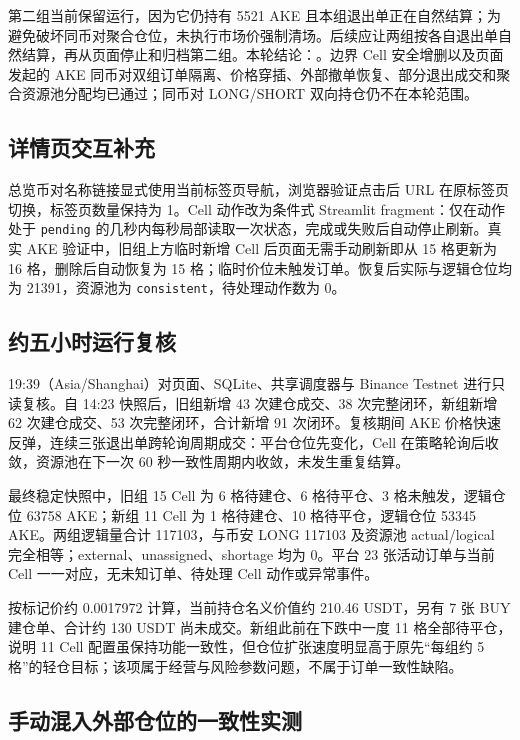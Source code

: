 第二组当前保留运行，因为它仍持有 5521 AKE 且本组退出单正在自然结算；为避免破坏同币对聚合仓位，未执行市场价强制清场。后续应让两组按各自退出单自然结算，再从页面停止和归档第二组。本轮结论：\StatusPass。边界 Cell 安全增删以及页面发起的 AKE 同币对双组订单隔离、价格穿插、外部撤单恢复、部分退出成交和聚合资源池分配均已通过；同币对 LONG/SHORT 双向持仓仍不在本轮范围。

\subsection{详情页交互补充}

总览币对名称链接显式使用当前标签页导航，浏览器验证点击后 URL 在原标签页切换，标签页数量保持为 1。Cell 动作改为条件式 Streamlit fragment：仅在动作处于 \texttt{pending} 的几秒内每秒局部读取一次状态，完成或失败后自动停止刷新。真实 AKE 验证中，旧组上方临时新增 Cell 后页面无需手动刷新即从 15 格更新为 16 格，删除后自动恢复为 15 格；临时价位未触发订单。恢复后实际与逻辑仓位均为 21391，资源池为 \texttt{consistent}，待处理动作数为 0。

\subsection{约五小时运行复核}

19:39（Asia/Shanghai）对页面、SQLite、共享调度器与 Binance Testnet 进行只读复核。自 14:23 快照后，旧组新增 43 次建仓成交、38 次完整闭环，新组新增 62 次建仓成交、53 次完整闭环，合计新增 91 次闭环。复核期间 AKE 价格快速反弹，连续三张退出单跨轮询周期成交：平台仓位先变化，Cell 在策略轮询后收敛，资源池在下一次 60 秒一致性周期内收敛，未发生重复结算。

最终稳定快照中，旧组 15 Cell 为 6 格待建仓、6 格待平仓、3 格未触发，逻辑仓位 63758 AKE；新组 11 Cell 为 1 格待建仓、10 格待平仓，逻辑仓位 53345 AKE。两组逻辑量合计 117103，与币安 LONG 117103 及资源池 actual/logical 完全相等；external、unassigned、shortage 均为 0。平台 23 张活动订单与当前 Cell 一一对应，无未知订单、待处理 Cell 动作或异常事件。

按标记价约 0.0017972 计算，当前持仓名义价值约 210.46 USDT，另有 7 张 BUY 建仓单、合计约 130 USDT 尚未成交。新组此前在下跌中一度 11 格全部待平仓，说明 11 Cell 配置虽保持功能一致性，但仓位扩张速度明显高于原先“每组约 5 格”的轻仓目标；该项属于经营与风险参数问题，不属于订单一致性缺陷。

\subsection{手动混入外部仓位的一致性实测}

